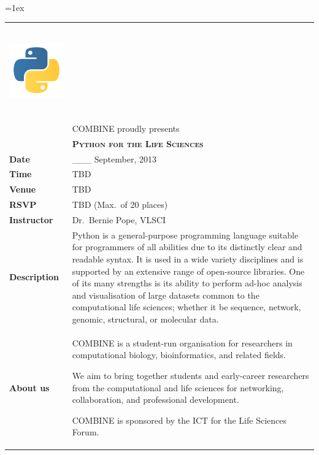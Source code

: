 \documentclass[12pt,a4paper]{article}
\begin{document}
    \thispagestyle{empty}
    \noindent\\
    \vfill
    \begin{minipage}[c]{0.9\textwidth}
        \centering
        \extrarowsep=1ex
        \begin{tabu} to 0.9\linewidth {X[1]X[3]}
            \includegraphics[height=40mm]{./images/python-logo.png} &  \\
            & COMBINE proudly presents\\[0.5ex]
            &\raggedright {\LARGE\scshape\bfseries Python for the Life
        Sciences}\\[3ex]
            \raggedleft\textbf{Date} & \_\_\_ September, 2013\\
            \raggedleft\textbf{Time} & TBD\\
            \raggedleft\textbf{Venue} & TBD\\
            \raggedleft\textbf{RSVP} & TBD (Max.~of 20 places)\\
            \raggedleft\textbf{Instructor} & Dr.~Bernie Pope, VLSCI\\
            \raggedleft\textbf{Description} & 
        Python is a general-purpose programming language suitable for
        programmers of all abilities due to its distinctly clear and readable
        syntax. It is used in a wide variety disciplines and is supported by an
        extensive range of open-source libraries. One of its many strengths is
        its ability to perform ad-hoc analysis and visualisation of large
        datasets common to the computational life sciences; whether it be
        sequence, network, genomic, structural, or molecular data.\\[1ex]
        \raggedleft\textbf{About us}&\raggedright 
            COMBINE is a student-run organisation for researchers in
            computational biology, bioinformatics, and related fields.\linebreak
            
            We aim to bring together students and early-career researchers from
            the computational and life sciences for networking, collaboration,
            and professional development.\linebreak

            COMBINE is sponsored by the ICT for the Life Sciences Forum.
        \end{tabu}
    \end{minipage}\\
    \vspace{40mm}
    \vfill
\end{document}
